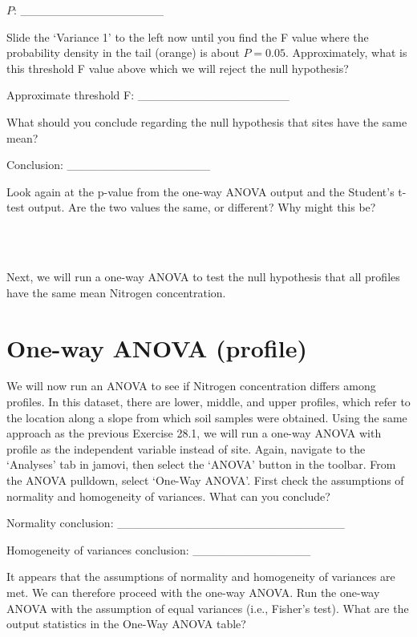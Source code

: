 \documentclass[
  openany]{krantz}
\begin{document}
\(P\): \_\_\_\_\_\_\_\_\_\_\_\_\_\_\_\_\_

Slide the `Variance 1' to the left now until you find the F value where the probability density in the tail (orange) is about \(P = 0.05\).
Approximately, what is this threshold F value above which we will reject the null hypothesis?

Approximate threshold F: \_\_\_\_\_\_\_\_\_\_\_\_\_\_\_\_\_\_

What should you conclude regarding the null hypothesis that sites have the same mean?

Conclusion: \_\_\_\_\_\_\_\_\_\_\_\_\_\_\_\_\_

Look again at the p-value from the one-way ANOVA output and the Student's t-test output.
Are the two values the same, or different?
Why might this be?

\begin{verbatim}



\end{verbatim}

Next, we will run a one-way ANOVA to test the null hypothesis that all profiles have the same mean Nitrogen concentration.

\hypertarget{one-way-anova-profile}{%
\section{One-way ANOVA (profile)}\label{one-way-anova-profile}}

We will now run an ANOVA to see if Nitrogen concentration differs among profiles.
In this dataset, there are lower, middle, and upper profiles, which refer to the location along a slope from which soil samples were obtained.
Using the same approach as the previous Exercise 28.1, we will run a one-way ANOVA with profile as the independent variable instead of site.
Again, navigate to the `Analyses' tab in jamovi, then select the `ANOVA' button in the toolbar.
From the ANOVA pulldown, select `One-Way ANOVA'.
First check the assumptions of normality and homogeneity of variances.
What can you conclude?

Normality conclusion: \_\_\_\_\_\_\_\_\_\_\_\_\_\_\_\_\_\_\_\_\_\_\_\_\_\_\_

Homogeneity of variances conclusion: \_\_\_\_\_\_\_\_\_\_\_\_\_\_

It appears that the assumptions of normality and homogeneity of variances are met.
We can therefore proceed with the one-way ANOVA.
Run the one-way ANOVA with the assumption of equal variances (i.e., Fisher's test).
What are the output statistics in the One-Way ANOVA table?
\end{document}
